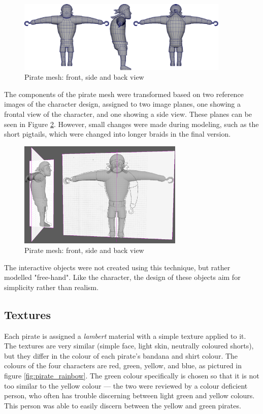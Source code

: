 \begin{figure}[h!]
	\centering
	\includegraphics[width=0.9\textwidth]{figures/pirate_mesh.png}
	\caption{Pirate mesh: front, side and back view \label{fig:pirate_mesh}}
\end{figure}

The components of the pirate mesh were transformed based on two reference images of the character design, assigned to two image planes, one showing a frontal view of the character, and one showing a side view. These planes can be seen in Figure \ref{fig:pirate_planes}. However, small changes were made during modeling, such as the short pigtails, which were changed into longer braids in the final version.

\begin{figure}[h!]
	\centering
	\includegraphics[width=0.7\textwidth]{figures/pirate_planes.png}
	\caption{Pirate mesh: front, side and back view \label{fig:pirate_planes}}
\end{figure}

The interactive objects were not created using this technique, but rather modelled "free-hand". Like the character, the design of these objects aim for simplicity rather than realism.

\subsection{Textures}
Each pirate is assigned a \textit{lambert} material with a simple texture applied to it. The textures are very similar (simple face, light skin, neutrally coloured shorts), but they differ in the colour of each pirate's bandana and shirt colour. The colours of the four characters are red, green, yellow, and blue, as pictured in figure \ref{fig:pirate_rainbow}. The green colour specifically is chosen so that it is not too similar to the yellow colour --- the two were reviewed by a colour deficient person, who often has trouble discerning between light green and yellow colours. This person was able to easily discern between the yellow and green pirates.

